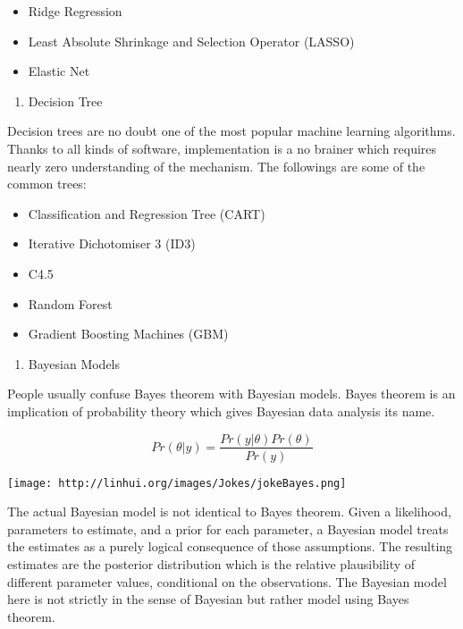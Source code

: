 \documentclass[
]{article}
\providecommand{\tightlist}{%
  \setlength{\itemsep}{0pt}\setlength{\parskip}{0pt}}
\begin{document}
\begin{itemize}
\tightlist
\item
  Ridge Regression
\item
  Least Absolute Shrinkage and Selection Operator (LASSO)
\item
  Elastic Net
\end{itemize}

\begin{enumerate}
\def\labelenumi{\arabic{enumi}.}
\setcounter{enumi}{4}
\tightlist
\item
  Decision Tree
\end{enumerate}

Decision trees are no doubt one of the most popular machine learning
algorithms. Thanks to all kinds of software, implementation is a no
brainer which requires nearly zero understanding of the mechanism. The
followings are some of the common trees:

\begin{itemize}
\tightlist
\item
  Classification and Regression Tree (CART)
\item
  Iterative Dichotomiser 3 (ID3)
\item
  C4.5
\item
  Random Forest
\item
  Gradient Boosting Machines (GBM)
\end{itemize}

\begin{enumerate}
\def\labelenumi{\arabic{enumi}.}
\setcounter{enumi}{5}
\tightlist
\item
  Bayesian Models
\end{enumerate}

People usually confuse Bayes theorem with Bayesian models. Bayes theorem
is an implication of probability theory which gives Bayesian data
analysis its name.

\[Pr(\theta|y)=\frac{Pr(y|\theta)Pr(\theta)}{Pr(y)}\]

\texttt{[image: http://linhui.org/images/Jokes/jokeBayes.png]}

The actual Bayesian model is not identical to Bayes theorem. Given a
likelihood, parameters to estimate, and a prior for each parameter, a
Bayesian model treats the estimates as a purely logical consequence of
those assumptions. The resulting estimates are the posterior
distribution which is the relative plausibility of different parameter
values, conditional on the observations. The Bayesian model here is not
strictly in the sense of Bayesian but rather model using Bayes theorem.
\end{document}
